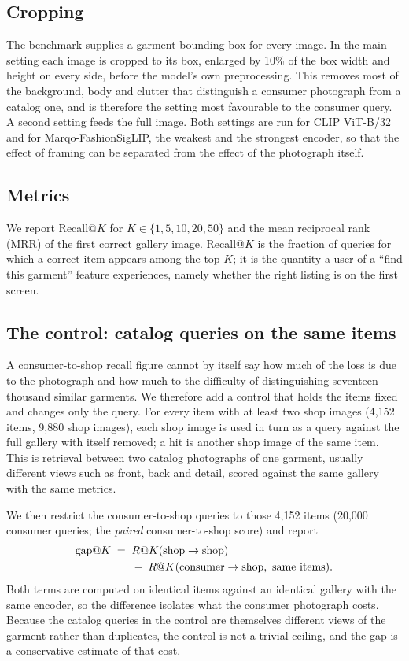 \documentclass[10pt,twocolumn,letterpaper]{article}
\makeatletter
\newcommand{\recall}[1]{R@#1}
\makeatother
\begin{document}
\subsection{Cropping}
The benchmark supplies a garment bounding box for every image. In the main setting each image is cropped to its box, enlarged by 10\% of the box width and height on every side, before the model's own preprocessing. This removes most of the background, body and clutter that distinguish a consumer photograph from a catalog one, and is therefore the setting most favourable to the consumer query. A second setting feeds the full image. Both settings are run for CLIP ViT-B/32 and for Marqo-FashionSigLIP, the weakest and the strongest encoder, so that the effect of framing can be separated from the effect of the photograph itself.

\subsection{Metrics}
We report Recall@$K$ for $K \in \{1, 5, 10, 20, 50\}$ and the mean reciprocal rank (MRR) of the first correct gallery image. Recall@$K$ is the fraction of queries for which a correct item appears among the top $K$; it is the quantity a user of a ``find this garment'' feature experiences, namely whether the right listing is on the first screen.

\subsection{The control: catalog queries on the same items}
\label{sec:control}
A consumer-to-shop recall figure cannot by itself say how much of the loss is due to the photograph and how much to the difficulty of distinguishing seventeen thousand similar garments. We therefore add a control that holds the items fixed and changes only the query. For every item with at least two shop images (4,152 items, 9,880 shop images), each shop image is used in turn as a query against the full gallery with itself removed; a hit is another shop image of the same item. This is retrieval between two catalog photographs of one garment, usually different views such as front, back and detail, scored against the same gallery with the same metrics.

We then restrict the consumer-to-shop queries to those 4,152 items (20,000 consumer queries; the \emph{paired} consumer-to-shop score) and report
\begin{align}
  \mathrm{gap}@K \;=\;{}& \recall{K}(\text{shop}\to\text{shop}) \notag\\
  & -\; \recall{K}(\text{consumer}\to\text{shop},\ \text{same items}).
\end{align}
Both terms are computed on identical items against an identical gallery with the same encoder, so the difference isolates what the consumer photograph costs. Because the catalog queries in the control are themselves different views of the garment rather than duplicates, the control is not a trivial ceiling, and the gap is a conservative estimate of that cost.
\end{document}
